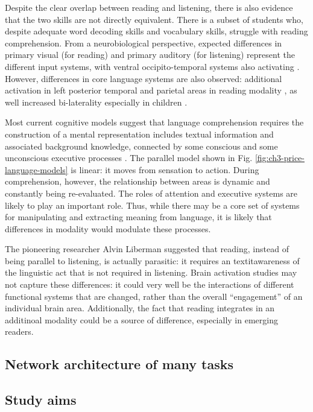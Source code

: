 Despite the clear overlap between reading and listening, there is also evidence that the two skills are not directly equivalent. There is a subset of students who, despite adequate word decoding skills and vocabulary skills, struggle with reading comprehension\citep{Pimperton2010, Spencer2014}. From a neurobiological perspective, expected differences in primary visual (for reading) and primary auditory (for listening) represent the different input systems, with ventral occipito-temporal systems also activating \citep{Jobard2007}. However, differences in core language systems are also observed: additional activation in left posterior temporal and parietal areas in reading modality \citep{Constable2004}, as well increased bi-laterality especially in children \citep{Berl2011}. 

Most current cognitive models suggest that language comprehension requires the construction of a mental representation includes textual information and associated background knowledge, connected by some conscious and some unconscious executive processes \citep{Kendeou2014}. The parallel model shown in Fig. \ref{fig:ch3-price-language-models} is linear: it moves from sensation to action. During comprehension, however, the relationship between areas is dynamic and constantly being re-evaluated. The roles of attention and executive systems are likely to play an important role. Thus, while there may be a core set of systems for manipulating and extracting meaning from language, it is likely that differences in modality would modulate these processes. 

The pioneering researcher Alvin Liberman suggested that reading, instead of being parallel to listening, is actually parasitic: it requires an textit{awareness} of the linguistic act that is not required in listening. Brain activation studies may not capture these differences: it could very well be the interactions of different functional systems that are changed, rather than the overall ``engagement'' of an individual brain area. Additionally, the fact that reading integrates in an additinoal modality could be a source of difference, especially in emerging readers. 

\subsection{Network architecture of many tasks}

\subsection{Study aims}

